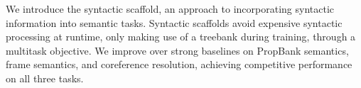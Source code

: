 We introduce the syntactic scaffold, an approach to incorporating syntactic information into semantic tasks. Syntactic scaffolds avoid expensive syntactic processing at runtime, only making use of a treebank during training, through a multitask objective. We improve over strong baselines on PropBank semantics, frame semantics, and coreference resolution, achieving competitive performance on all three tasks.
